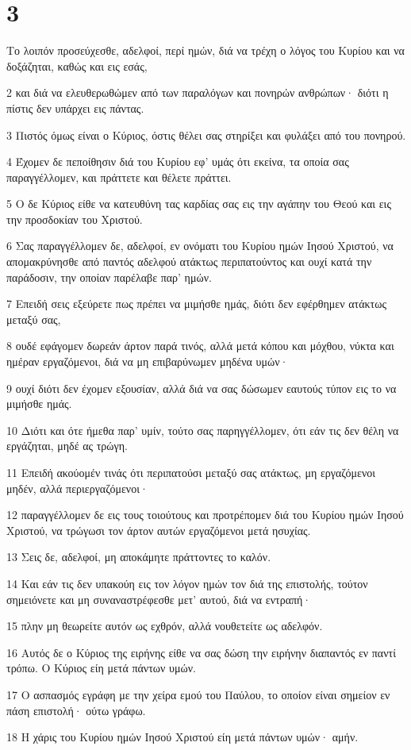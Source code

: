 \chapter{3}

\par Το λοιπόν προσεύχεσθε, αδελφοί, περί ημών, διά να τρέχη ο λόγος του Κυρίου και να δοξάζηται, καθώς και εις εσάς,
\par 2 και διά να ελευθερωθώμεν από των παραλόγων και πονηρών ανθρώπων· διότι η πίστις δεν υπάρχει εις πάντας.
\par 3 Πιστός όμως είναι ο Κύριος, όστις θέλει σας στηρίξει και φυλάξει από του πονηρού.
\par 4 Έχομεν δε πεποίθησιν διά του Κυρίου εφ' υμάς ότι εκείνα, τα οποία σας παραγγέλλομεν, και πράττετε και θέλετε πράττει.
\par 5 Ο δε Κύριος είθε να κατευθύνη τας καρδίας σας εις την αγάπην του Θεού και εις την προσδοκίαν του Χριστού.
\par 6 Σας παραγγέλλομεν δε, αδελφοί, εν ονόματι του Κυρίου ημών Ιησού Χριστού, να απομακρύνησθε από παντός αδελφού ατάκτως περιπατούντος και ουχί κατά την παράδοσιν, την οποίαν παρέλαβε παρ' ημών.
\par 7 Επειδή σεις εξεύρετε πως πρέπει να μιμήσθε ημάς, διότι δεν εφέρθημεν ατάκτως μεταξύ σας,
\par 8 ουδέ εφάγομεν δωρεάν άρτον παρά τινός, αλλά μετά κόπου και μόχθου, νύκτα και ημέραν εργαζόμενοι, διά να μη επιβαρύνωμεν μηδένα υμών·
\par 9 ουχί διότι δεν έχομεν εξουσίαν, αλλά διά να σας δώσωμεν εαυτούς τύπον εις το να μιμήσθε ημάς.
\par 10 Διότι και ότε ήμεθα παρ' υμίν, τούτο σας παρηγγέλλομεν, ότι εάν τις δεν θέλη να εργάζηται, μηδέ ας τρώγη.
\par 11 Επειδή ακούομέν τινάς ότι περιπατούσι μεταξύ σας ατάκτως, μη εργαζόμενοι μηδέν, αλλά περιεργαζόμενοι·
\par 12 παραγγέλλομεν δε εις τους τοιούτους και προτρέπομεν διά του Κυρίου ημών Ιησού Χριστού, να τρώγωσι τον άρτον αυτών εργαζόμενοι μετά ησυχίας.
\par 13 Σεις δε, αδελφοί, μη αποκάμητε πράττοντες το καλόν.
\par 14 Και εάν τις δεν υπακούη εις τον λόγον ημών τον διά της επιστολής, τούτον σημειόνετε και μη συναναστρέφεσθε μετ' αυτού, διά να εντραπή·
\par 15 πλην μη θεωρείτε αυτόν ως εχθρόν, αλλά νουθετείτε ως αδελφόν.
\par 16 Αυτός δε ο Κύριος της ειρήνης είθε να σας δώση την ειρήνην διαπαντός εν παντί τρόπω. Ο Κύριος είη μετά πάντων υμών.
\par 17 Ο ασπασμός εγράφη με την χείρα εμού του Παύλου, το οποίον είναι σημείον εν πάση επιστολή· ούτω γράφω.
\par 18 Η χάρις του Κυρίου ημών Ιησού Χριστού είη μετά πάντων υμών· αμήν.


